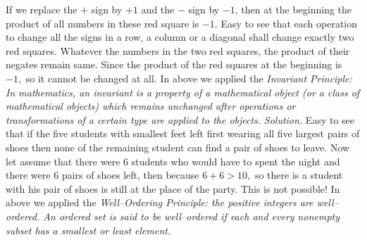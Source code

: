 \begin{multicols}{2}
\begin{center}
	\end{center}	
	If we replace the $+$ sign by $+1$ and the $-$ sign by $-1$, then at the beginning the product of all numbers in these red square is $-1.$ 
	Easy to see that each operation to change all the signs in a row, a column or a diagonal shall change exactly two red squares.
	Whatever the numbers in the two red squares, the product of their negates remain same.
	Since the product of the red squares at the beginning is $-1,$ so it cannot be changed at all.
	\vskip 0.1cm
	In above we applied the \textit{Invariant Principle: In mathematics, an invariant is a property of a mathematical object
		(or a class of mathematical objects) which remains unchanged after operations or transformations of a certain type are applied to the objects.} 
	\vskip 0.2cm
	\vskip 0.2cm
	\textit{Solution.}
	Easy to see that if the five students with smallest feet left first wearing all five largest pairs of shoes
	then none of the remaining student can find a pair of shoes to leave.
	Now let assume that there were $6$ students who would have to spent the night and there were $6$ pairs of shoes left,
	then because $6 + 6 > 10,$ so there is a student with his pair of shoes is still at the place of the party. This is not possible!
	\vskip 0.1cm
	In above we applied the \textit{Well--Ordering Principle: the positive integers are well--ordered.
		An ordered set is said to be well--ordered if each and every nonempty subset has a smallest or least element.} 
	\vskip 0.2cm
\end{multicols}
